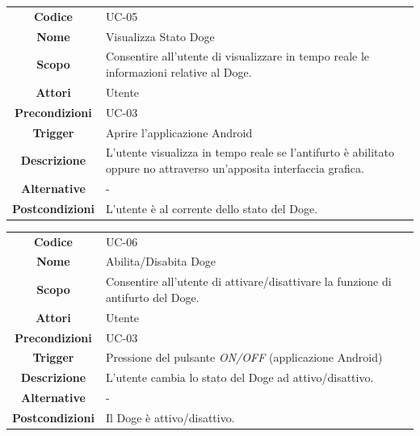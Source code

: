 \documentclass{article}
\begin{document}
\begin{adjustbox}{center}
\begin{tabular}{|c|p{10cm}|}
\hline
\textbf{Codice} & UC-05 \\
\textbf{Nome} & Visualizza Stato Doge \\
\textbf{Scopo} & Consentire all'utente di visualizzare in tempo reale le informazioni relative al Doge. \\
\textbf{Attori} & Utente \\
\textbf{Precondizioni} & UC-03 \\
\textbf{Trigger} & Aprire l'applicazione Android \\
\textbf{Descrizione} & L'utente visualizza in tempo reale se l'antifurto è abilitato oppure no attraverso un'apposita interfaccia grafica. \\
\textbf{Alternative} & - \\
\textbf{Postcondizioni} & L'utente è al corrente dello stato del Doge. \\
\hline
\end{tabular}
\end{adjustbox}

\begin{adjustbox}{center}
\begin{tabular}{|c|p{10cm}|}
\hline
\textbf{Codice} & UC-06 \\
\textbf{Nome} & Abilita/Disabita Doge \\
\textbf{Scopo} & Consentire all'utente di attivare/disattivare la funzione di antifurto del Doge. \\
\textbf{Attori} & Utente \\
\textbf{Precondizioni} & UC-03 \\
\textbf{Trigger} & Pressione del pulsante \emph{ON/OFF} (applicazione Android) \\
\textbf{Descrizione} & L'utente cambia lo stato del Doge ad attivo/disattivo. \\
\textbf{Alternative} & - \\
\textbf{Postcondizioni} & Il Doge è attivo/disattivo. \\
\hline
\end{tabular}
\end{adjustbox}
\end{document}
